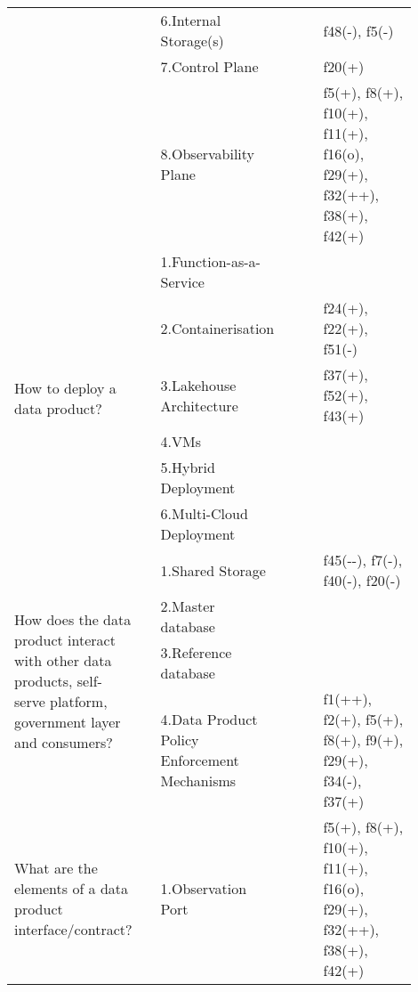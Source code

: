 \begin{tabular}{|p{0.12\linewidth}|p{0.015\linewidth}|p{0.3\linewidth}|p{0.15\linewidth}|p{0.31\linewidth}|}
 & \cellcolor{emerald_shape_6}{} & 6.Internal Storage(s)&\cellcolor{emerald_shape_4}{s4, s13, s15, s32, s33, s36, s49, i1, i4} & f48(-), f5(-)\\
 & \cellcolor{emerald_shape_6}{} & 7.Control Plane&\cellcolor{emerald_shape_2}{s49, s52, i1, i3} & f20(+)\\
 & \multirow{-8}{\linewidth}{ \cellcolor{emerald_shape_6}{43}} &8.Observability Plane&\cellcolor{emerald_shape_3}{s3, s7, s11, s13, s22, s52, i3} & f5(+), f8(+), f10(+), f11(+), f16(o), f29(+), f32(++), f38(+), f42(+)\\
\multirow{6}{\linewidth}{How to deploy a data product?} &\cellcolor{emerald_shape_4}{} &1.Function-as-a-Service&\cellcolor{emerald_shape_5}{s15, s21, s30, s31, s32, s33, s35, s36} & \\
 & \cellcolor{emerald_shape_4}{} & 2.Containerisation&\cellcolor{emerald_shape_6}{s14, s15, s30, s32, s33, s45, s47, i3, i4, i6} & f24(+), f22(+), f51(-)\\
 & \cellcolor{emerald_shape_4}{} & 3.Lakehouse Architecture&\cellcolor{emerald_shape_3}{i5, i6} & f37(+), f52(+), f43(+)\\
 & \cellcolor{emerald_shape_4}{} & 4.VMs&\cellcolor{emerald_shape_3}{i3, i4} & \\
 & \cellcolor{emerald_shape_4}{} & 5.Hybrid Deployment&\cellcolor{emerald_shape_1}{} & \\
 & \multirow{-6}{\linewidth}{ \cellcolor{emerald_shape_4}{17}} &6.Multi-Cloud Deployment&\cellcolor{emerald_shape_1}{} & \\
\multirow{4}{\linewidth}{How does the data product interact with other data products, self-serve platform, government layer and consumers?} &\cellcolor{emerald_shape_7}{} &1.Shared Storage&\cellcolor{emerald_shape_1}{s33, i3} & f45(-{}-), f7(-), f40(-), f20(-)\\
 & \cellcolor{emerald_shape_7}{} & 2.Master database&\cellcolor{emerald_shape_1}{} & \\
 & \cellcolor{emerald_shape_7}{} & 3.Reference database&\cellcolor{emerald_shape_1}{} & \\
 & \multirow{-4}{\linewidth}{ \cellcolor{emerald_shape_7}{55}} &4.Data Product Policy Enforcement Mechanisms&\cellcolor{emerald_shape_5}{s1, s3, s4, s5, s6, s12, s15, s20, s23, s27, s31, s32, s36, s38, s39, s40, s43, s47, s52, s56, i5} & f1(++), f2(+), f5(+), f8(+), f9(+), f29(+), f34(-), f37(+)\\
\multirow{6}{\linewidth}{What are the elements of a data product interface/contract?} &\cellcolor{emerald_shape_4}{} &1.Observation Port&\cellcolor{emerald_shape_6}{s3, s7, s11, s13, s22, s52, i2, i3, i4, i6} & f5(+), f8(+), f10(+), f11(+), f16(o), f29(+), f32(++), f38(+), f42(+)\\

\end{tabular}
